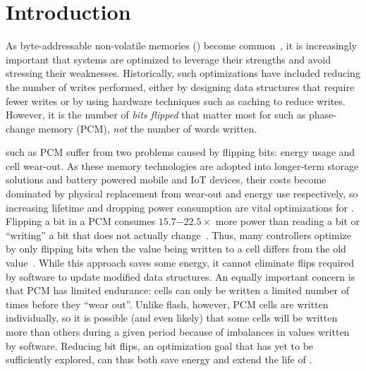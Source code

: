 
\section{Introduction}

As byte-addressable non-volatile memories (\NVMs) become
common~\cite{lee_architecting_2009,fox:2001feram,intel3dxpoint}, it is
increasingly important that systems are optimized to leverage their
strengths and avoid stressing their weaknesses.  Historically, such
optimizations have included reducing the number of writes performed, either by
designing data structures that require fewer writes or by using hardware
techniques such as caching to reduce writes. However, it is the number of \emph{bits flipped} that
matter most for \NVMs such as phase-change memory (PCM), \emph{not} the number of words written.


\NVMs such as PCM suffer from two problems caused by flipping bits: energy usage
and cell wear-out.
As these memory technologies are adopted into longer-term storage solutions and
battery powered mobile and IoT devices, their costs become dominated by physical
replacement from wear-out and energy use respectively, so increasing lifetime
and dropping power consumption are vital optimizations for \NVM.
Flipping a bit in a PCM consumes
$15.7\mathit{-}22.5\times$ more power than reading a bit or ``writing''
a bit that does not actually
change~\cite{dhiman_pdram:_2009,lee_architecting_2009,xiangyu_dong_nvsim:_2012,qureshi_scalable_2009}.
Thus, many controllers optimize by only flipping bits when the value being
written to a cell differs from the old value~\cite{yang:iscas07}.  While this
approach saves some energy, it cannot eliminate flips required by software to
update modified data structures. An equally important concern is that PCM has
limited endurance: cells can only be written a limited number of times before
they ``wear out''. Unlike flash, however, PCM cells are written individually, so
it is possible (and even likely) that some cells will be written more than
others during a given period because of imbalances in values written by
software. Reducing bit flips, an optimization goal that has yet to be
sufficiently explored, can thus both save energy and extend the life of \NVM.

%



